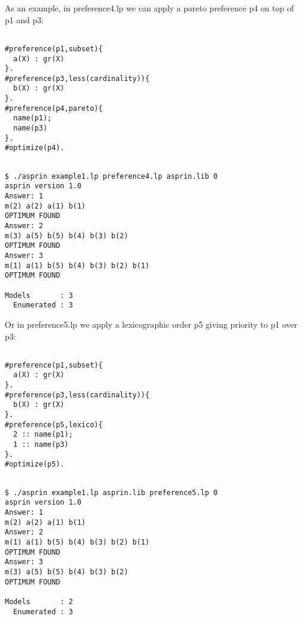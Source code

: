   As an example, in preference4.lp we can apply a pareto preference p4 on top of p1 and p3: 
\begin{verbatim}

#preference(p1,subset){                                                                                             
  a(X) : gr(X)                                                                                                    
}.
#preference(p3,less(cardinality)){                                                                                             
  b(X) : gr(X)                                                                                                    
}.
#preference(p4,pareto){
  name(p1);
  name(p3)
}.
#optimize(p4).
\end{verbatim}
\begin{verbatim}

$ ./asprin example1.lp preference4.lp asprin.lib 0
asprin version 1.0
Answer: 1
m(2) a(2) a(1) b(1)
OPTIMUM FOUND
Answer: 2
m(3) a(5) b(5) b(4) b(3) b(2)
OPTIMUM FOUND
Answer: 3
m(1) a(1) b(5) b(4) b(3) b(2) b(1)
OPTIMUM FOUND

Models       : 3
  Enumerated : 3

\end{verbatim}

 Or in preference5.lp we apply a lexicographic order p5 giving priority to p1 over p3: 
\begin{verbatim}

#preference(p1,subset){                                                                                             
  a(X) : gr(X)                                                                                                    
}.
#preference(p3,less(cardinality)){                                                                                             
  b(X) : gr(X)                                                                                                    
}.
#preference(p5,lexico){
  2 :: name(p1);
  1 :: name(p3)
}.
#optimize(p5).
\end{verbatim}
\begin{verbatim}

$ ./asprin example1.lp asprin.lib preference5.lp 0
asprin version 1.0
Answer: 1
m(2) a(2) a(1) b(1)
Answer: 2
m(1) a(1) b(5) b(4) b(3) b(2) b(1)
OPTIMUM FOUND
Answer: 3
m(3) a(5) b(5) b(4) b(3) b(2)
OPTIMUM FOUND

Models       : 2
  Enumerated : 3
  
\end{verbatim}

